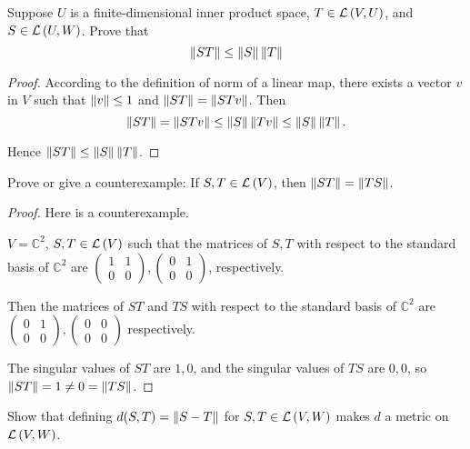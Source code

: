 \begin{exercise}\label{chapter7:sectionF:exercise5}
    Suppose $U$ is a finite-dimensional inner product space, $T\in\mathcal{L}\left({V, U}\right)$, and $S\in\mathcal{L}\left({U, W}\right)$. Prove that
    \[
        \left\Vert{ST}\right\Vert\leq \left\Vert{S}\right\Vert\left\Vert{T}\right\Vert
    \]
\end{exercise}

\begin{proof}
    According to the definition of norm of a linear map, there exists a vector $v$ in $V$ such that $\left\Vert{v}\right\Vert\leq 1$ and $\left\Vert{ST}\right\Vert = \left\Vert{STv}\right\Vert$. Then
    \[
        \left\Vert{ST}\right\Vert = \left\Vert{STv}\right\Vert\leq \left\Vert{S}\right\Vert\left\Vert{Tv}\right\Vert \leq \left\Vert{S}\right\Vert\left\Vert{T}\right\Vert.
    \]

    Hence $\left\Vert{ST}\right\Vert\leq\left\Vert{S}\right\Vert\left\Vert{T}\right\Vert$.
\end{proof}
\newpage

\begin{exercise}
    Prove or give a counterexample: If $S, T \in \mathcal{L}\left({V}\right)$, then $\left\Vert{ST}\right\Vert = \left\Vert{TS}\right\Vert$.
\end{exercise}

\begin{proof}
    Here is a counterexample.

    $V = \mathbb{C}^{2}$, $S, T\in\mathcal{L}\left({V}\right)$ such that the matrices of $S, T$ with respect to the standard basis of $\mathbb{C}^{2}$ are $\begin{pmatrix}1 & 1 \\ 0 & 0 \end{pmatrix}, \begin{pmatrix} 0 & 1 \\ 0 & 0 \end{pmatrix}$, respectively.

    Then the matrices of $ST$ and $TS$ with respect to the standard basis of $\mathbb{C}^{2}$ are $\begin{pmatrix}0 & 1 \\ 0 & 0\end{pmatrix}, \begin{pmatrix}0 & 0 \\ 0 & 0\end{pmatrix}$ respectively.

    The singular values of $ST$ are $1, 0$, and the singular values of $TS$ are $0, 0$, so $\left\Vert{ST}\right\Vert = 1\ne 0 = \left\Vert{TS}\right\Vert$.
\end{proof}
\newpage

\begin{exercise}\label{chapter7:sectionF:exercise7}
    Show that defining $d(S, T) = \left\Vert{S - T}\right\Vert$ for $S, T \in \mathcal{L}\left({V, W}\right)$ makes $d$ a metric on $\mathcal{L}\left({V, W}\right)$.
\end{exercise}

